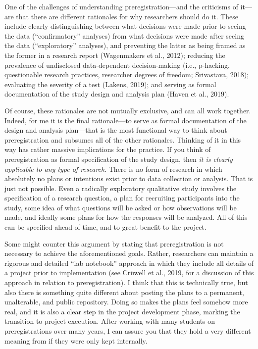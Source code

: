 \documentclass[authordate, empirical,issue]{jote-new-article}
\begin{document}
One of the challenges of understanding preregistration—and the criticisms of it—are that there are different rationales for why researchers should do it. These include clearly distinguishing between what decisions were made prior to seeing the data (“confirmatory” analyses) from what decisions were made after seeing the data (“exploratory” analyses), and preventing the latter as being framed as the former in a research report (Wagenmakers et al., 2012); reducing the prevalence of undisclosed data-dependent decision-making (i.e., p-hacking, questionable research practices, researcher degrees of freedom; Srivastava, 2018); evaluating the severity of a test (Lakens, 2019); and serving as formal documentation of the study design and analysis plan (Haven et al., 2019).







Of course, these rationales are not mutually exclusive, and can all work together. Indeed, for me it is the final rationale—to serve as formal documentation of the design and analysis plan—that is the most functional way to think about preregistration and subsumes all of the other rationales. Thinking of it in this way has rather massive implications for the practice. If you think of preregistration as formal specification of the study design, then \emph{it is clearly applicable to any type of research}. There is no form of research in which absolutely no plans or intentions exist prior to data collection or analysis. That is just not possible. Even a radically exploratory qualitative study involves the specification of a research question, a plan for recruiting participants into the study, some idea of what questions will be asked or how observations will be made, and ideally some plans for how the responses will be analyzed. All of this can be specified ahead of time, and to great benefit to the project.







Some might counter this argument by stating that preregistration is not necessary to achieve the aforementioned goals. Rather, researchers can maintain a rigorous and detailed “lab notebook” approach in which they include all details of a project prior to implementation (see Crüwell et al., 2019, for a discussion of this approach in relation to preregistration). I think that this is technically true, but also there is something quite different about posting the plans to a permanent, unalterable, and public repository. Doing so makes the plans feel somehow more real, and it is also a clear step in the project development phase, marking the transition to project execution. After working with many students on preregistrations over many years, I can assure you that they hold a very different meaning from if they were only kept internally.
\end{document}
